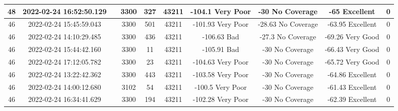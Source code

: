 \begin{longtable*}{|c|c|c|c|c|c|c|c|c|c|}
48&2022-02-24 16:52:50.129&&3300&327&43211& -104.1    Very Poor   & -30       No Coverage & -65       Excellent   & 0\\\hline
{}46&2022-02-24 15:45:59.043&&3300&501&43211& -101.93   Very Poor   & -28.63    No Coverage & -63.95    Excellent   & 0\\\hline
{}46&2022-02-24 14:10:29.485&&3300&436&43211& -106.63   Bad         & -27.3     No Coverage & -69.26    Very Good   & 0\\\hline
{}46&2022-02-24 15:44:42.160&&3300&11&43211& -105.91   Bad         & -30       No Coverage & -66.43    Very Good   & 0\\\hline
{}46&2022-02-24 17:12:05.782&&3300&23&43211& -104.63   Very Poor   & -30       No Coverage & -65.72    Very Good   & 0\\\hline
{}46&2022-02-24 13:22:42.362&&3300&443&43211& -103.58   Very Poor   & -30       No Coverage & -64.86    Excellent   & 0\\\hline
{}46&2022-02-24 14:00:12.680&&3102&54&43211& -100.5    Very Poor   & -30       No Coverage & -61.43    Excellent   & 0\\\hline
{}46&2022-02-24 16:34:41.629&&3300&194&43211& -102.28   Very Poor   & -30       No Coverage & -62.39    Excellent   & 0\\\hline

\end{longtable*}
